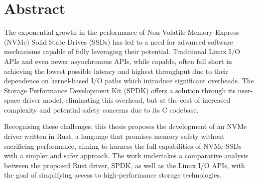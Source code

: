 \chapter{Abstract}
The exponential growth in the performance of Non-Volatile Memory Express (NVMe) Solid State Drives (SSDs) has led to a need for advanced software mechanisms capable of fully leveraging their potential. Traditional Linux I/O APIs and even newer asynchronous APIs, while capable, often fall short in achieving the lowest possible latency and highest throughput due to their dependence on kernel-based I/O paths which introduce significant overheads. The Storage Performance Development Kit (SPDK) offers a solution through its user-space driver model, eliminating this overhead, but at the cost of increased complexity and potential safety concerns due to its C codebase.

Recognising these challenges, this thesis proposes the development of an NVMe driver written in Rust, a language that promises memory safety without sacrificing performance, aiming to harness the full capabilities of NVMe SSDs with a simpler and safer approach. The work undertakes a comparative analysis between the proposed Rust driver, SPDK, as well as the Linux I/O APIs, with the goal of simplifying access to high-performance storage technologies.


